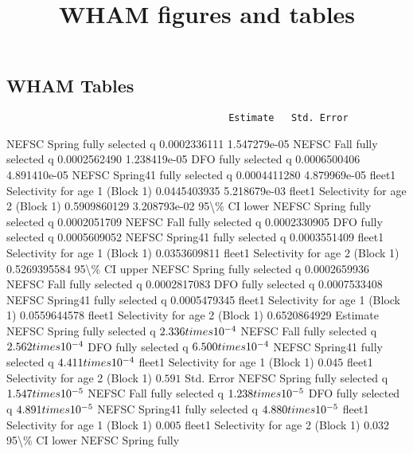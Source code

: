 \documentclass[
]{article}
\title{WHAM figures and tables}
\author{}
\date{\vspace{-2.5em}}
\begin{document}
\maketitle

\subsection{WHAM Tables}\label{wham-tables}

\begin{verbatim}
                                       Estimate   Std. Error
\end{verbatim}

NEFSC Spring fully selected q 0.0002336111 1.547279e-05 NEFSC Fall fully
selected q 0.0002562490 1.238419e-05 DFO fully selected q 0.0006500406
4.891410e-05 NEFSC Spring41 fully selected q 0.0004411280 4.879969e-05
fleet1 Selectivity for age 1 (Block 1) 0.0445403935 5.218679e-03 fleet1
Selectivity for age 2 (Block 1) 0.5909860129 3.208793e-02
95\textbackslash\% CI lower NEFSC Spring fully selected q 0.0002051709
NEFSC Fall fully selected q 0.0002330905 DFO fully selected q
0.0005609052 NEFSC Spring41 fully selected q 0.0003551409 fleet1
Selectivity for age 1 (Block 1) 0.0353609811 fleet1 Selectivity for age
2 (Block 1) 0.5269395584 95\textbackslash\% CI upper NEFSC Spring fully
selected q 0.0002659936 NEFSC Fall fully selected q 0.0002817083 DFO
fully selected q 0.0007533408 NEFSC Spring41 fully selected q
0.0005479345 fleet1 Selectivity for age 1 (Block 1) 0.0559644578 fleet1
Selectivity for age 2 (Block 1) 0.6520864929 Estimate NEFSC Spring fully
selected q \(2.336\\times 10^{-4}\) NEFSC Fall fully selected q
\(2.562\\times 10^{-4}\) DFO fully selected q \(6.500\\times 10^{-4}\)
NEFSC Spring41 fully selected q \(4.411\\times 10^{-4}\) fleet1
Selectivity for age 1 (Block 1) \(0.045\) fleet1 Selectivity for age 2
(Block 1) \(0.591\) Std. Error NEFSC Spring fully selected q
\(1.547\\times 10^{-5}\) NEFSC Fall fully selected q
\(1.238\\times 10^{-5}\) DFO fully selected q \(4.891\\times 10^{-5}\)
NEFSC Spring41 fully selected q \(4.880\\times 10^{-5}\) fleet1
Selectivity for age 1 (Block 1) \(0.005\) fleet1 Selectivity for age 2
(Block 1) \(0.032\) 95\textbackslash\% CI lower NEFSC Spring fully
\end{document}
